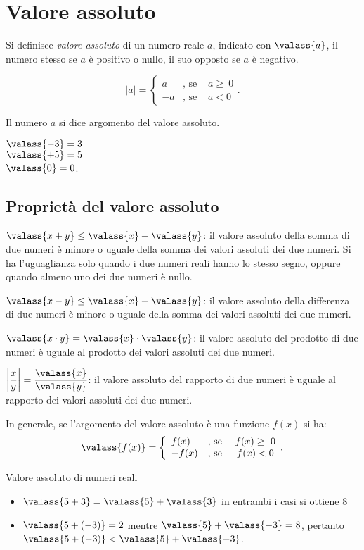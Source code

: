 
\section{Valore assoluto}

Si definisce \emph{valore assoluto} di un numero reale $a$, indicato con 
$\valass{a}$, il numero stesso se $a$ è positivo o nullo, il suo opposto se $a$ 
è negativo.

\[
|a|=\left\{\begin{array}{lcc}
 a & \text{, se } & a\ge~0\\
-a & \text{, se } & a<0\end{array}.\right.
\]

Il numero $a$ si dice argomento del valore assoluto.
\begin{multicols}{3}
$\valass{-3}=3$\\$\valass{+5}=5$\\$\valass{0}=0$.
\end{multicols}
\subsection{Proprietà del valore assoluto}
$\valass{x+y}\le \valass{x}+\valass{y}$: il valore assoluto della somma di due 
numeri è minore o uguale della somma dei valori assoluti dei due numeri. Si ha 
l'uguaglianza solo quando i due numeri reali hanno lo stesso segno, oppure 
quando almeno uno dei due numeri è nullo.

$\valass{x-y}\le \valass{x}+\valass{y}$: il valore assoluto della differenza di 
due numeri è minore o uguale della somma dei valori assoluti dei due numeri.

$\valass{x\cdot y}=\valass{x}\cdot \valass{y}$: il valore assoluto del prodotto 
di due numeri
è uguale al prodotto dei valori assoluti dei due numeri.

$\left |{\dfrac{x}{y}}\right|=\dfrac{\valass{x}}{\valass{y}}$: il valore 
assoluto del rapporto di due
numeri è uguale al rapporto dei valori assoluti dei due numeri.

In generale, se l'argomento del valore assoluto è una funzione $f(x)$ si ha:
\[
\valass{f(x)}=\left\{\begin{array}{lcc}
 f(x) & \text{, se } & f(x)\ge~0\\
-f(x) & \text{, se } & f(x)<0\end{array}.\right.
\]
\begin{exrig}
 \begin{esempio}
 Valore assoluto di numeri reali
 \begin{itemize}
 \item $\valass{5+3}=\valass{5}+\valass{3}$ in entrambi i casi si ottiene $8$
 \item $\valass{5+(-3)}=2$ mentre $\valass{5}+\valass{-3}=8$, pertanto 
$\valass{5+(-3)}<\valass{5}+\valass{-3}$.
 \end{itemize}
 \end{esempio}
\end{exrig}

